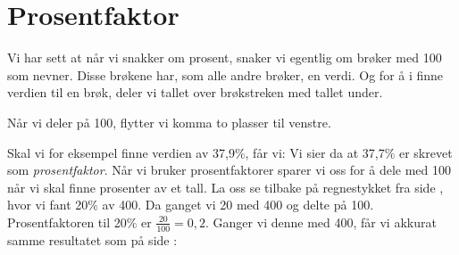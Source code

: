 \section{Prosentfaktor}
\parbox[l][][l]{0.6\linewidth}{Vi har sett at når vi snakker om prosent, snaker vi egentlig om brøker med 100 som nevner. Disse brøkene har, som alle andre brøker, en verdi. Og for å i finne verdien til en brøk, deler vi tallet over brøkstreken med tallet under.}\qquad
\parbox[r][][l]{0.3\linewidth}{\begin{shaded}%
		Når vi deler på 100, flytter vi komma to plasser til venstre.\end{shaded}}
\newline
\vsk 
Skal vi for eksempel finne verdien av 37,9\%, får vi:
Vi sier da at 37,7\% er skrevet som \textit{prosentfaktor}.\regv
{}
\vsk
Når vi bruker prosentfaktorer sparer vi oss for å dele med 100 når vi skal finne prosenter av et tall. La oss se tilbake på regnestykket fra side \pageref{20pro}, hvor vi fant 20\% av 400. Da ganget vi 20 med 400 og delte på 100. Prosentfaktoren til 20\% er $ {\frac{20}{100}=0,2} $. Ganger vi denne med 400, får vi akkurat samme resultatet som på side \pageref{20pro}:
